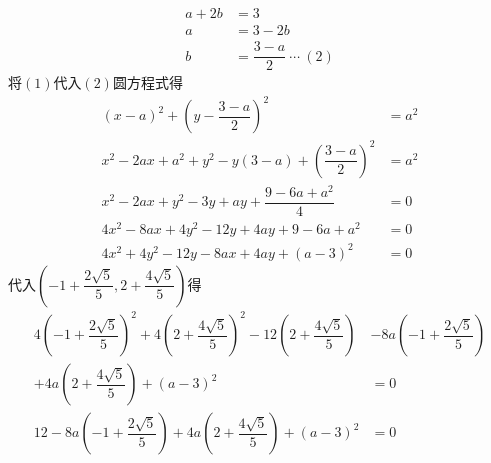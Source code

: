 \documentclass[10pt]{article}
\begin{document}
\begin{enumerate}[leftmargin=*]
\begin{enumerate}
\begin{align*}
                  a + 2b                                                                                                                             & = 3                                                                                                                    \\
                  a                                                                                                                                  & = 3 - 2b                                                                                                               \\
                  b                                                                                                                                  & = \dfrac{3 - a}{2}\ \cdots\ (2)
                \end{align*}
                将$(1)$代入$(2)$圆方程式得
                \begin{align*}
                  (x - a)^{2} + \left(y - \dfrac{3 - a}{2}\right)^{2}                  & = a^{2} \\
                  x^2 - 2ax + a^2 + y^2 - y(3 - a) + \left(\dfrac{3 - a}{2}\right)^{2} & = a^{2} \\
                  x^2 - 2ax + y^2 - 3y + ay + \dfrac{9 - 6a + a^2}{4}                  & = 0     \\
                  4x^2 - 8ax + 4y^2 - 12y + 4ay + 9 - 6a + a^2                         & = 0     \\
                  4x^2 + 4y^2 - 12y - 8ax + 4ay + (a - 3)^2                            & = 0
                \end{align*}
                \newpage
                代入$\left(-1 + \dfrac{2\sqrt{5}}{5}, 2 + \dfrac{4\sqrt{5}}{5}\right)$得
                \begin{align*}
                  4\left(-1 + \dfrac{2\sqrt{5}}{5}\right)^{2} + 4\left(2 + \dfrac{4\sqrt{5}}{5}\right)^{2} - 12\left(2 + \dfrac{4\sqrt{5}}{5}\right) & - 8a\left(-1 + \dfrac{2\sqrt{5}}{5}\right) \\
                  + 4a\left(2 + \dfrac{4\sqrt{5}}{5}\right) + (a - 3)^{2}                                                                            & = 0                                        \\
                  12 - 8a\left(-1 + \dfrac{2\sqrt{5}}{5}\right) + 4a\left(2 + \dfrac{4\sqrt{5}}{5}\right) + (a - 3)^{2}                              & = 0                                        \\

\end{align*}
\end{enumerate}
\end{enumerate}
\end{document}
